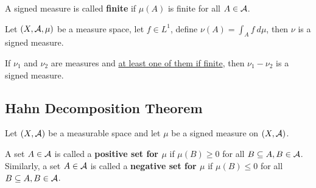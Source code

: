 \documentclass[11pt]{article}
\newcommand{\dmu}[0]{\ d\mu}
\begin{document}
	\begin{definition}
		A signed measure is called \textbf{finite} if $\mu(A)$ is finite for all $A \in \mathcal{{A}}$.
	\end{definition}

	\begin{example}
		Let $(X, \mathcal{{A}}, \mu)$ be a measure space, let $f \in L^1$, define $\nu(A) = \int_A f\dmu$, then $\nu$ is a signed measure.
	\end{example}

	\begin{example}
		If $\nu_1$ and $\nu_2$ are measures and \ul{at least one of them if finite}, then $\nu_1 - \nu_2$ is a signed measure.
	\end{example}
	
	\subsection{Hahn Decomposition Theorem}
	\par Let $(X, \mathcal{{A}})$ be a measurable space and let $\mu$ be a signed measure on $(X, \mathcal{{A}})$.
	\begin{definition}
		A set $A \in \mathcal{{A}}$ is called a \textbf{positive set for $\mu$} if $\mu(B) \geq 0$ for all $B \subseteq A, B \in \mathcal{{A}}$.
		Similarly, a set $A \in \mathcal{{A}}$ is called a \textbf{negative set for $\mu$} if $\mu(B) \leq 0$ for all $B \subseteq A, B \in \mathcal{{A}}$.
	\end{definition}
	
\end{document}
